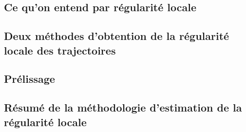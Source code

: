 \subsection{Ce qu'on entend par régularité locale}




\subsection{Deux méthodes d'obtention de la régularité locale des trajectoires}




\subsection{Prélissage}



\subsection{Résumé de la méthodologie d'estimation de la régularité locale}


